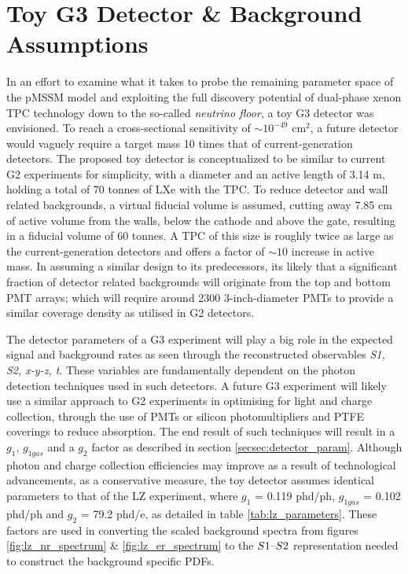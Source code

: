 \section{Toy G3 Detector \& Background Assumptions}
\label{sec:g3_assumptions}

In an effort to examine what it takes to probe the remaining parameter space of the pMSSM model and exploiting the full discovery potential of dual-phase xenon TPC technology down to the so-called \textit{neutrino floor}, a toy G3 detector was envisioned. To reach a cross-sectional sensitivity of $\sim10^{-49}$ cm$^{2}$, a future detector would vaguely require a target mass 10 times that of current-generation detectors. The proposed toy detector is conceptualized to be similar to current G2 experiments for simplicity, with a diameter and an active length of 3.14 m, holding a total of 70 tonnes of LXe with the TPC. To reduce detector and wall related backgrounds, a virtual fiducial volume is assumed, cutting away 7.85 cm of active volume from the walls, below the cathode and above the gate, resulting in a fiducial volume of 60 tonnes. A TPC of this size is roughly twice as large as the current-generation detectors and offers a factor of $\sim10$ increase in active mass. In assuming a similar design to its predecessors, its likely that a significant fraction of detector related backgrounds will originate from the top and bottom PMT arrays; which will require around 2300 3-inch-diameter PMTs to provide a similar coverage density as utilised in G2 detectors. 

The detector parameters of a G3 experiment will play a big role in the expected signal and background rates as seen through the reconstructed observables \textit{S1, S2, x-y-z, t}. These variables are fundamentally dependent on the photon detection techniques used in such detectors. A future G3 experiment will likely use a similar approach to G2 experiments in optimising for light and charge collection, through the use of PMTs or silicon photomultipliers \cite{Gundacker_2020} and PTFE coverings to reduce absorption. The end result of such techniques will result in a $g_{1}$, $g_{1gas}$ and a $g_{2}$ factor as described in section \ref{secsec:detector_param}. Although photon and charge collection efficiencies may improve as a result of technological advancements, as a conservative measure, the toy detector assumes identical parameters to that of the LZ experiment, where $g_{1}$ = 0.119 phd/ph, $g_{1gas}$ = 0.102 phd/ph and $g_{2}$ = 79.2 phd/e, as detailed in table \ref{tab:lz_parameters}. These factors are used in converting the scaled background spectra from figures \ref{fig:lz_nr_spectrum} \& \ref{fig:lz_er_spectrum} to the $S1\text{--}{}S2$ representation needed to construct the background specific PDFs. 


